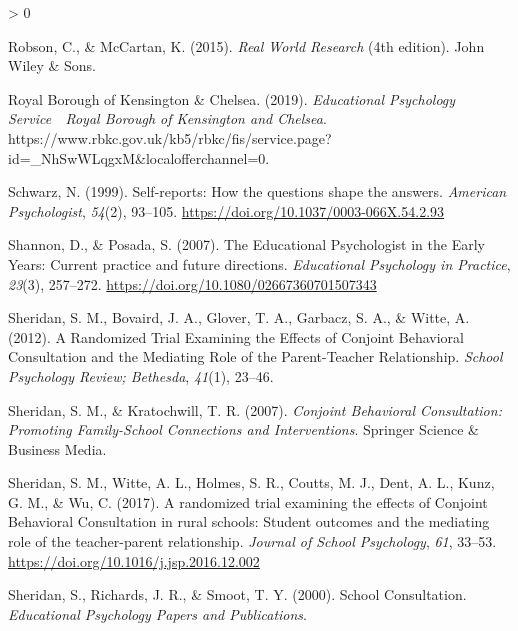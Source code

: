 \documentclass[
  english,
  man]{apa}
\newlength{\cslhangindent}
\newenvironment{CSLReferences}[2] %
 {%
  \setlength{\parindent}{0pt}
  \ifodd #1 \everypar{\setlength{\hangindent}{\cslhangindent}}\ignorespaces\fi
  \ifnum #2 > 0
  \setlength{\parskip}{#2\baselineskip}
  \fi
 }%
 {}
\begin{document}
\begin{CSLReferences}{1}{0}
\leavevmode\hypertarget{ref-robsonRealWorldResearch2015}{}%
Robson, C., \& McCartan, K. (2015). \emph{Real {World Research}} (4th edition). {John Wiley \& Sons}.

\leavevmode\hypertarget{ref-royalboroughofkensingtonchelseaEducationalPsychologyService2019}{}%
Royal Borough of Kensington \& Chelsea. (2019). \emph{Educational {Psychology Service}~\textbar~{Royal Borough} of {Kensington} and {Chelsea}}. https://www.rbkc.gov.uk/kb5/rbkc/fis/service.page?id=\_NhSwWLqgxM\&localofferchannel=0.

\leavevmode\hypertarget{ref-schwarzSelfreportsHowQuestions1999}{}%
Schwarz, N. (1999). Self-reports: {How} the questions shape the answers. \emph{American Psychologist}, \emph{54}(2), 93--105. \url{https://doi.org/10.1037/0003-066X.54.2.93}

\leavevmode\hypertarget{ref-shannonEducationalPsychologistEarly2007}{}%
Shannon, D., \& Posada, S. (2007). The {Educational Psychologist} in the {Early Years}: {Current} practice and future directions. \emph{Educational Psychology in Practice}, \emph{23}(3), 257--272. \url{https://doi.org/10.1080/02667360701507343}

\leavevmode\hypertarget{ref-sheridanRandomizedTrialExamining2012}{}%
Sheridan, S. M., Bovaird, J. A., Glover, T. A., Garbacz, S. A., \& Witte, A. (2012). A {Randomized Trial Examining} the {Effects} of {Conjoint Behavioral Consultation} and the {Mediating Role} of the {Parent}-{Teacher Relationship}. \emph{School Psychology Review; Bethesda}, \emph{41}(1), 23--46.

\leavevmode\hypertarget{ref-sheridanConjointBehavioralConsultation2007}{}%
Sheridan, S. M., \& Kratochwill, T. R. (2007). \emph{Conjoint {Behavioral Consultation}: {Promoting Family}-{School Connections} and {Interventions}}. {Springer Science \& Business Media}.

\leavevmode\hypertarget{ref-sheridanRandomizedTrialExamining2017}{}%
Sheridan, S. M., Witte, A. L., Holmes, S. R., Coutts, M. J., Dent, A. L., Kunz, G. M., \& Wu, C. (2017). A randomized trial examining the effects of {Conjoint Behavioral Consultation} in rural schools: {Student} outcomes and the mediating role of the teacher-parent relationship. \emph{Journal of School Psychology}, \emph{61}, 33--53. \url{https://doi.org/10.1016/j.jsp.2016.12.002}

\leavevmode\hypertarget{ref-sheridanSchoolConsultation2000}{}%
Sheridan, S., Richards, J. R., \& Smoot, T. Y. (2000). School {Consultation}. \emph{Educational Psychology Papers and Publications}.


\end{CSLReferences}
\end{document}
